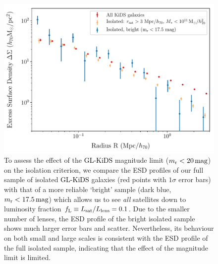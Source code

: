 \documentclass[usenatbib]{mnras}
\newcommand{\magn}{\, {\rm mag} }
\newcommand{\un}[1]{_{\rm #1}}
\begin{document}
\begin{figure}
	\includegraphics[width=1.0\columnwidth]{Figures/ESD_KiDS_isotest.pdf}
	\caption{To assess the effect of the \textcolor{black}{GL-KiDS} magnitude limit ($m\un{r}<20 \magn$) on the isolation criterion, we compare the ESD profiles of our full sample of isolated \textcolor{black}{GL-KiDS} galaxies (red points with $1\sigma$ error bars) with that of a more reliable `bright' sample (dark blue, $m\un{r}<17.5 \magn$) which allows us to see \emph{all} satellites down to luminosity fraction $f\un{L} \equiv L\un{sat}/L\un{lens}=0.1$. Due to the smaller number of lenses, the ESD profile of the bright isolated sample shows much larger error bars and scatter. Nevertheless, its behaviour on both small and large scales is consistent with the ESD profile of the full isolated sample, indicating that the effect of the magnitude limit is limited.}
	\label{fig:isolation_test_ESD}
\end{figure}
\end{document}
